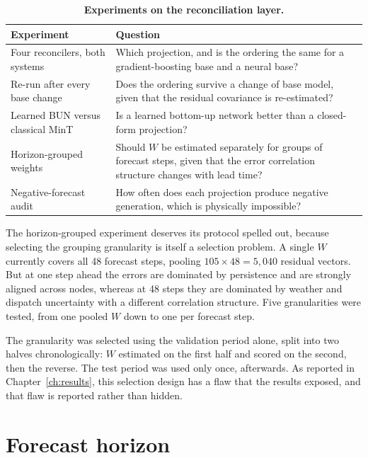 \begin{table}[htp]
\centering
\begin{tabular}{p{4.6cm}p{8.4cm}}
\toprule
{\bf Experiment} & {\bf Question} \\
\midrule
Four reconcilers, both systems & Which projection, and is the ordering the same for a
gradient-boosting base and a neural base? \\
Re-run after every base change & Does the ordering survive a change of base model, given
that the residual covariance is re-estimated? \\
Learned BUN versus classical MinT & Is a learned bottom-up network better than a
closed-form projection? \\
Horizon-grouped weights & Should $W$ be estimated separately for groups of forecast steps,
given that the error correlation structure changes with lead time? \\
Negative-forecast audit & How often does each projection produce negative generation, which
is physically impossible? \\
\bottomrule
\end{tabular}
\caption[Reconciliation experiments]{\textbf{Experiments on the reconciliation layer.}}
\label{tab:recon-exp}
\end{table}

The horizon-grouped experiment deserves its protocol spelled out, because selecting the
grouping granularity is itself a selection problem. A single $W$ currently covers all 48
forecast steps, pooling $105 \times 48 = 5{,}040$ residual vectors. But at one step ahead
the errors are dominated by persistence and are strongly aligned across nodes, whereas at
48 steps they are dominated by weather and dispatch uncertainty with a different
correlation structure. Five granularities were tested, from one pooled $W$ down to one per
forecast step.

The granularity was selected using the validation period alone, split into two halves
chronologically: $W$ estimated on the first half and scored on the second, then the
reverse. The test period was used only once, afterwards. As reported in
Chapter~\ref{ch:results}, this selection design has a flaw that the results exposed, and
that flaw is reported rather than hidden.

\section{Forecast horizon}
\label{sec:exp-horizon}

